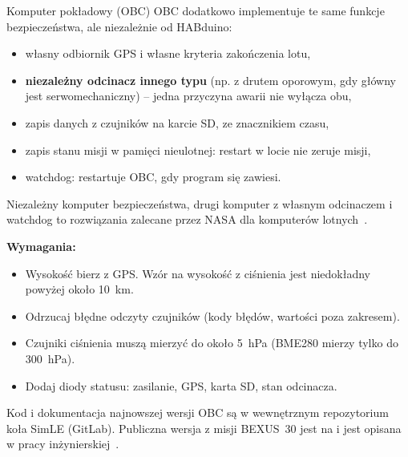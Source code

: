\begin{sekcja}{Komputer pokładowy (OBC)}
OBC dodatkowo implementuje te same funkcje bezpieczeństwa, ale niezależnie od HABduino:
\begin{itemize}
  \item własny odbiornik GPS i własne kryteria zakończenia lotu,
  \item \textbf{niezależny odcinacz innego typu} (np. z drutem oporowym, gdy główny jest serwomechaniczny) -- jedna przyczyna awarii nie wyłącza obu,
  \item zapis danych z czujników na karcie SD, ze znacznikiem czasu,
  \item zapis stanu misji w pamięci nieulotnej: restart w locie nie zeruje misji,
  \item watchdog: restartuje OBC, gdy program się zawiesi.
\end{itemize}
Niezależny komputer bezpieczeństwa, drugi komputer z własnym odcinaczem i watchdog to rozwiązania zalecane przez NASA dla komputerów lotnych~\cite[rozdz.~12]{nasahb}.

\textbf{Wymagania:}
\begin{itemize}
  \item Wysokość bierz z GPS. Wzór na wysokość z ciśnienia jest niedokładny powyżej około \SI{10}{km}.
  \item Odrzucaj błędne odczyty czujników (kody błędów, wartości poza zakresem).
  \item Czujniki ciśnienia muszą mierzyć do około \SI{5}{hPa} (BME280 mierzy tylko do \SI{300}{hPa}).
  \item Dodaj diody statusu: zasilanie, GPS, karta SD, stan odcinacza.
\end{itemize}
Kod i dokumentacja najnowszej wersji OBC są w wewnętrznym repozytorium koła SimLE (GitLab). Publiczna wersja z misji BEXUS~30 jest na  i jest opisana w pracy inżynierskiej~\cite{praca2022}.
\end{sekcja}

